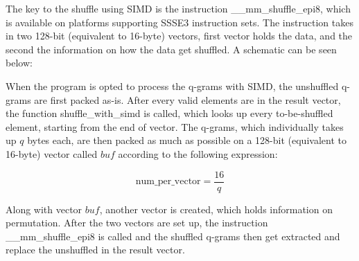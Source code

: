 The key to the shuffle using SIMD is the instruction \_\_mm\_shuffle\_epi8, which is available on platforms supporting SSSE3 instruction sets. The instruction takes in two 128-bit (equivalent to 16-byte) vectors, first vector holds the data, and the second the information on how the data get shuffled. A schematic can be seen below:

When the program is opted to process the q-grams with SIMD, the unshuffled q-grams are first packed as-is. After every valid elements are in the result vector, the function shuffle\_with\_simd is called, which looks up every to-be-shuffled element, starting from the end of vector. The q-grams, which individually takes up $q$ bytes each, are then packed as much as possible on a 128-bit (equivalent to 16-byte) vector called $buf$ according to the following expression:

$$\text{num\_per\_vector} = \frac{16}{q}$$

Along with vector $buf$, another vector is created, which holds information on permutation. After the two vectors are set up, the instruction \_\_mm\_shuffle\_epi8 is called and the shuffled q-grams then get extracted and replace the unshuffled in the result vector.